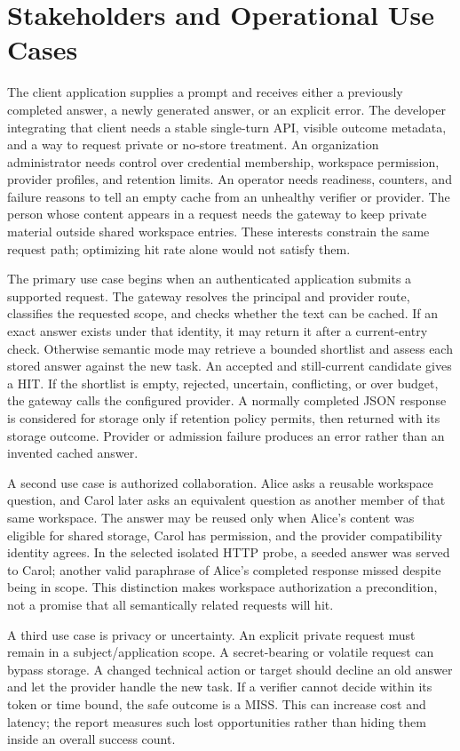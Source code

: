 \section{Stakeholders and Operational Use Cases}
The client application supplies a prompt and receives either a previously completed answer, a newly generated answer, or an explicit error. The developer integrating that client needs a stable single-turn API, visible outcome metadata, and a way to request private or no-store treatment. An organization administrator needs control over credential membership, workspace permission, provider profiles, and retention limits. An operator needs readiness, counters, and failure reasons to tell an empty cache from an unhealthy verifier or provider. The person whose content appears in a request needs the gateway to keep private material outside shared workspace entries. These interests constrain the same request path; optimizing hit rate alone would not satisfy them.

The primary use case begins when an authenticated application submits a supported request. The gateway resolves the principal and provider route, classifies the requested scope, and checks whether the text can be cached. If an exact answer exists under that identity, it may return it after a current-entry check. Otherwise semantic mode may retrieve a bounded shortlist and assess each stored answer against the new task. An accepted and still-current candidate gives a HIT. If the shortlist is empty, rejected, uncertain, conflicting, or over budget, the gateway calls the configured provider. A normally completed JSON response is considered for storage only if retention policy permits, then returned with its storage outcome. Provider or admission failure produces an error rather than an invented cached answer.

A second use case is authorized collaboration. Alice asks a reusable workspace question, and Carol later asks an equivalent question as another member of that same workspace. The answer may be reused only when Alice's content was eligible for shared storage, Carol has permission, and the provider compatibility identity agrees. In the selected isolated HTTP probe, a seeded answer was served to Carol; another valid paraphrase of Alice's completed response missed despite being in scope. This distinction makes workspace authorization a precondition, not a promise that all semantically related requests will hit.

A third use case is privacy or uncertainty. An explicit private request must remain in a subject/application scope. A secret-bearing or volatile request can bypass storage. A changed technical action or target should decline an old answer and let the provider handle the new task. If a verifier cannot decide within its token or time bound, the safe outcome is a MISS. This can increase cost and latency; the report measures such lost opportunities rather than hiding them inside an overall success count.


